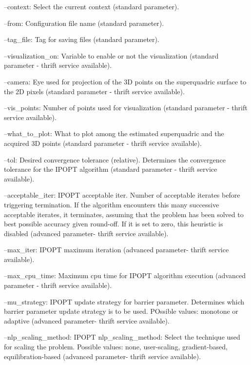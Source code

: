 \begin{DoxyItemize}
\item --context\+: Select the current context (standard parameter).
\item --from\+: Configuration file name (standard parameter).
\item --tag\+\_\+file\+: Tag for saving files (standard parameter).
\item --visualization\+\_\+on\+: Variable to enable or not the visualization (standard parameter -\/ thrift service available).
\item --camera\+: Eye used for projection of the 3D points on the superquadric surface to the 2D pixels (standard parameter -\/ thrift service available).
\item --vis\+\_\+points\+: Number of points used for visualization (standard parameter -\/ thrift service available).
\item --what\+\_\+to\+\_\+plot\+: What to plot among the estimated superquadric and the acquired 3D points (standard parameter -\/ thrift service available).
\item --tol\+: Desired convergence tolerance (relative). Determines the convergence tolerance for the I\+P\+O\+PT algorithm (standard parameter -\/ thrift service available).
\item --acceptable\+\_\+iter\+: I\+P\+O\+PT acceptable iter. Number of acceptable iterates before triggering termination. If the algorithm encounters this many successive acceptable iterates, it terminates, assuming that the problem has been solved to best possible accuracy given round-\/off. If it is set to zero, this heuristic is disabled (advanced parameter-\/ thrift service available).
\item --max\+\_\+iter\+: I\+P\+O\+PT maximum iteration (advanced parameter-\/ thrift service available).
\item --max\+\_\+cpu\+\_\+time\+: Maximum cpu time for I\+P\+O\+PT algorithm execution (advanced parameter -\/ thrift service available).
\item --mu\+\_\+strategy\+: I\+P\+O\+PT update strategy for barrier parameter. Determines which barrier parameter update strategy is to be used. P\+Ossible values\+: monotone or adaptive (advanced parameter-\/ thrift service available).
\item --nlp\+\_\+scaling\+\_\+method\+: I\+P\+O\+PT nlp\+\_\+scaling\+\_\+method\+: Select the technique used for scaling the problem. Possible values\+: none, user-\/scaling, gradient-\/based, equilibration-\/based (advanced parameter-\/ thrift service available).

\end{DoxyItemize}
